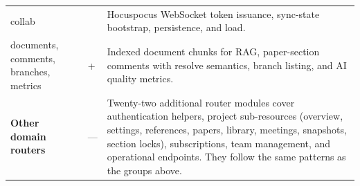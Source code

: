 \begin{longtable}{@{}>{\raggedright\arraybackslash\ttfamily\small}p{4.8cm} >{\centering\arraybackslash}p{1.6cm} >{\raggedright\arraybackslash}p{\dimexpr\textwidth-7.0cm\relax}@{}}
collab               &  4 & Hocuspocus WebSocket token issuance, sync-state bootstrap, persistence, and load. \\
documents, comments, branches, metrics & 7+ & Indexed document chunks for RAG, paper-section comments with resolve semantics, branch listing, and AI quality metrics. \\
\midrule
\normalfont\textbf{Other domain routers} & --- & Twenty-two additional router modules cover authentication helpers, project sub-resources (overview, settings, references, papers, library, meetings, snapshots, section locks), subscriptions, team management, and operational endpoints. They follow the same patterns as the groups above. \\
\end{longtable}
